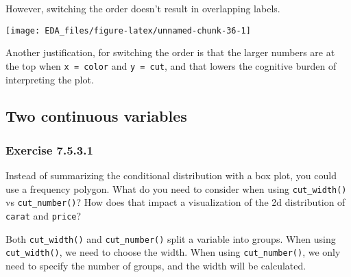 \documentclass[]{book}
\newenvironment{Shaded}{\begin{snugshade}}{\end{snugshade}}
\newcommand{\DataTypeTok}[1]{\textcolor[rgb]{0.13,0.29,0.53}{#1}}
\newcommand{\KeywordTok}[1]{\textcolor[rgb]{0.13,0.29,0.53}{\textbf{#1}}}
\newcommand{\NormalTok}[1]{#1}
\newcommand{\OperatorTok}[1]{\textcolor[rgb]{0.81,0.36,0.00}{\textbf{#1}}}
\newcommand{\StringTok}[1]{\textcolor[rgb]{0.31,0.60,0.02}{#1}}
\theoremstyle{plain}
\theoremstyle{remark}
\begin{document}
However, switching the order doesn't result in overlapping labels.

\begin{Shaded}
\end{Shaded}

\begin{center}\texttt{[image: EDA\_files/figure-latex/unnamed-chunk-36-1]} \end{center}

Another justification, for switching the order is that the larger
numbers are at the top when \texttt{x\ =\ color} and \texttt{y\ =\ cut},
and that lowers the cognitive burden of interpreting the plot.

\hypertarget{two-continuous-variables}{%
\subsection{Two continuous variables}\label{two-continuous-variables}}

\hypertarget{exercise-7.5.3.1}{%
\subsubsection*{\texorpdfstring{Exercise
{7.5.3.1}}{Exercise 7.5.3.1}}\label{exercise-7.5.3.1}}

Instead of summarizing the conditional distribution with a box plot, you
could use a frequency polygon. What do you need to consider when using
\texttt{cut\_width()} vs \texttt{cut\_number()}? How does that impact a
visualization of the 2d distribution of \texttt{carat} and
\texttt{price}?

Both \texttt{cut\_width()} and \texttt{cut\_number()} split a variable
into groups. When using \texttt{cut\_width()}, we need to choose the
width. When using \texttt{cut\_number()}, we only need to specify the
number of groups, and the width will be calculated.
\end{document}
